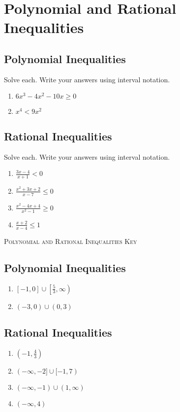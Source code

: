 \chapter{Polynomial and Rational Inequalities}

\section{Polynomial Inequalities}

Solve each. Write your answers using interval notation.
\begin{enumerate}
\item $6x^3-4x^2-10x \geq 0$
\item $x^4 < 9x^2$
\end{enumerate}

\section{Rational Inequalities}

Solve each. Write your answers using interval notation.
\begin{enumerate}
\setlength\itemsep{10pt}
\item $\frac{3x-4}{x+1}<0$
\item $\frac{x^2+3x+2}{x-7} \leq 0$
\item $\frac{x^2-4x+4}{x^2-1} \geq 0$
\item $\frac{x+2}{x-4} \leq 1$
\end{enumerate}

\newpage

\textsc{Polynomial and Rational Inequalities Key}

\section*{Polynomial Inequalities}
\begin{enumerate}
    \item $[-1,0] \cup \left[\frac{5}{3}, \infty\right)$
    \item $(-3,0) \cup (0,3)$
\end{enumerate}
\section*{Rational Inequalities}
\begin{enumerate}
    \item $\left(-1, \frac{4}{3}\right)$
    \item $(-\infty,-2] \cup [-1, 7)$
    \item $(-\infty, -1) \cup (1, \infty)$
    \item $(-\infty, 4)$
\end{enumerate}